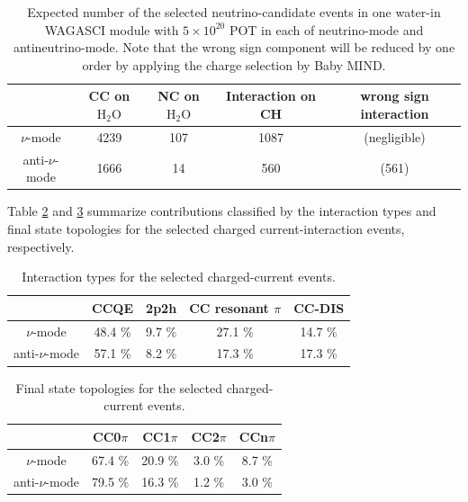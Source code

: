 \begin{table}[htbp]
  \begin{center}
    \caption{Expected number of the selected neutrino-candidate events in one water-in WAGASCI module with $5\times 10^{20}$ POT in each of neutrino-mode and antineutrino-mode.
      Note that the wrong sign component will be reduced by one order by applying the charge selection by Baby MIND.}
    \begin{tabular}{ccccc} \hline
   & CC on $\mathrm{H_2O}$ & NC on $\mathrm{H_2O}$ & Interaction on CH  & wrong sign interaction\\ \hline
   $\nu$-mode & 4239 & 107 & 1087 & (negligible) \\ \hline
   anti-$\nu$-mode & 1666 & 14 & 560 & (561) \\
\hline
    \end{tabular}
    \label{tab:expected_num_events}
  \end{center}
\end{table}


Table \ref{tab:expected_num_cc_events} and \ref{tab:expected_num_ccfsi_events} summarize
contributions classified by the interaction types and final state topologies for the selected charged current-interaction events, respectively.
%
\begin{table}[htbp]
  \begin{center}
    \caption{Interaction types for the selected charged-current events.}
    \begin{tabular}{c|cccc} \hline
& CCQE & 2p2h & CC resonant $\pi$  & CC-DIS \\ \hline
$\nu$-mode & 48.4 \% & 9.7 \% & 27.1 \% & 14.7 \% \\
anti-$\nu$-mode &  57.1 \% & 8.2 \% & 17.3 \% & 17.3 \% \\
\hline
    \end{tabular}
    \label{tab:expected_num_cc_events}
  \end{center}
\end{table}
%
\begin{table}[htbp]
  \begin{center}
    \caption{Final state topologies for the selected charged-current events.}
    \begin{tabular}{c|cccc} \hline
& CC0$\pi$ & CC1$\pi$ & CC2$\pi$ & CCn$\pi$ \\ \hline
      $\nu$-mode & 67.4 \% & 20.9 \% & 3.0 \% & 8.7 \% \\ \hline
      anti-$\nu$-mode & 79.5 \% & 16.3 \% & 1.2 \% & 3.0 \% \\\hline
    \end{tabular}
    \label{tab:expected_num_ccfsi_events}
  \end{center}
\end{table}

